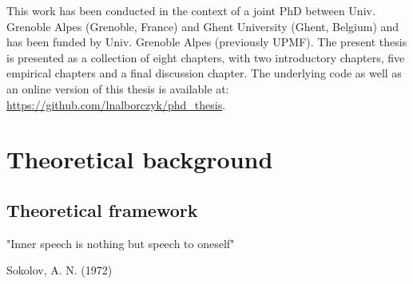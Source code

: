 \documentclass[a4paper,12pt,twoside,openright,oldfontcommands]{memoir}
\newcommand{\initial}[1]{
	\lettrine[lines=3,lhang=0.33,nindent=0em]{
		\color{gray}
     		{\textsc{#1}}}{}}
\newcommand{\clearemptydoublepage}{\newpage{\thispagestyle{empty}\cleardoublepage}}
\begin{document}
\initial{T}his work has been conducted in the context of a joint PhD between Univ. Grenoble Alpes (Grenoble, France) and Ghent University (Ghent, Belgium) and has been funded by Univ. Grenoble Alpes (previously UPMF). The present thesis is presented as a collection of eight chapters, with two introductory chapters, five empirical chapters and a final discussion chapter. The underlying code as well as an online version of this thesis is available at: \url{https://github.com/lnalborczyk/phd_thesis}.

\clearemptydoublepage

\renewcommand{\contentsname}{Table of contents}
\tableofcontents*
{}
\newpage

\listoftables
{}
\newpage

\listoffigures
{}
\newpage


\hypertarget{part-theoretical-background}{%
\part{Theoretical background}\label{part-theoretical-background}}

\sloppy 

\hypertarget{intro}{%
\chapter{Theoretical framework}\label{intro}}

\epigraph{"Inner speech is nothing but speech to oneself"}{Sokolov, A. N. (1972)}
\end{document}
